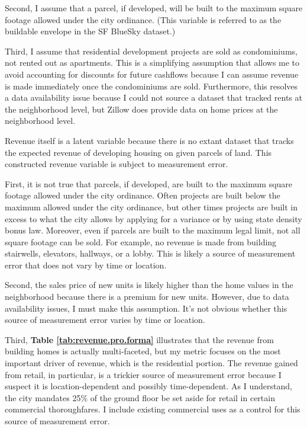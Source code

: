 \documentclass[a4paper,12pt]{article}
\begin{document}
\renewcommand{\arraystretch}{1}

Second, I assume that a parcel, if developed, will be built to the maximum square footage allowed under the city ordinance. (This variable is referred to as the buildable envelope in the SF BlueSky dataset.) 

Third, I assume that residential development projects are sold as condominiums, not rented out as apartments. This is a simplifying assumption that allows me to avoid accounting for discounts for future cashflows because I can assume revenue is made immediately once the condominiums are sold. Furthermore, this resolves a data availability issue because I could not source a dataset that tracked rents at the neighborhood level, but Zillow does provide data on home prices at the neighborhood level.

Revenue itself is a latent variable because there is no extant dataset that tracks the expected revenue of developing housing on given parcels of land. This constructed revenue variable is subject to measurement error.

First, it is not true that parcels, if developed, are built to the maximum square footage allowed under the city ordinance. Often projects are built below the maximum allowed under the city ordinance, but other times projects are built in excess to what the city allows by applying for a variance or by using state density bonus law. Moreover, even if parcels are built to the maximum legal limit, not all square footage can be sold. For example, no revenue is made from building stairwells, elevators, hallways, or a lobby. This is likely a source of measurement error that does not vary by time or location.

Second, the sales price of new units is likely higher than the home values in the neighborhood because there is a premium for new units. However, due to data availability issues, I must make this assumption. It’s not obvious whether this source of measurement error varies by time or location.

Third, \textbf{Table \ref{tab:revenue.pro.forma}} illustrates that the revenue from building homes is actually multi-faceted, but my metric focuses on the most important driver of revenue, which is the residential portion. The revenue gained from retail, in particular, is a trickier source of measurement error because I suspect it is location-dependent and possibly time-dependent. As I understand, the city mandates 25\% of the ground floor be set aside for retail in certain commercial thoroughfares. I include existing commercial uses as a control for this source of measurement error.
\end{document}
